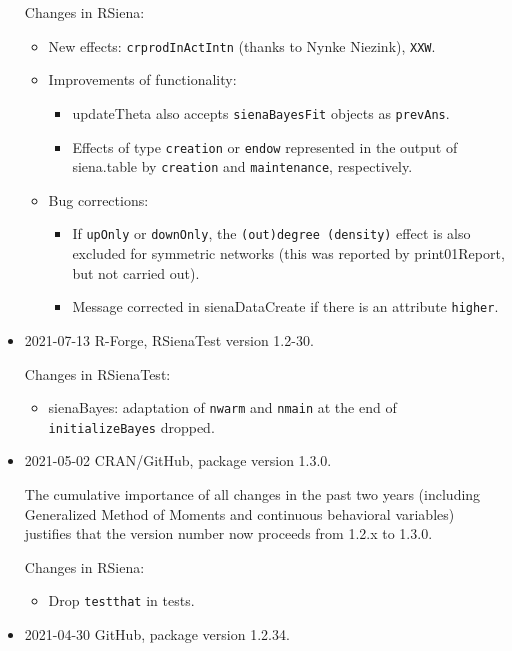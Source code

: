 \documentclass[a4paper,fleqn,11pt]{article}
\newcommand{\+}{\, + \,}
\newcommand{\sfn}[1]{\textsf{#1}}
\begin{document}
\begin{small}
\begin{itemize}
Changes in RSiena:
\begin{itemize}
\item New effects: \texttt{crprodInActIntn} (thanks to Nynke Niezink),
    \texttt{XXW}.
\item Improvements of functionality:
   \begin{itemize}
   \item \sfn{updateTheta} also accepts \texttt{sienaBayesFit} objects
     as \texttt{prevAns}.
   \item Effects of type \texttt{creation} or \texttt{endow} represented in the output of
   \textsf{siena.table} by \texttt{creation} and \texttt{maintenance}, respectively.
    \end{itemize}
\item Bug corrections:
   \begin{itemize}
   \item If \texttt{upOnly} or \texttt{downOnly},
     the \texttt{(out)degree (density)} effect is also excluded
     for symmetric networks
     (this was reported by \textsf{print01Report}, but not carried out).
   \item Message corrected in \textsf{sienaDataCreate} if there is an attribute
   \texttt{higher}.
    \end{itemize}
\end{itemize}


\item 2021-07-13  R-Forge, \sfn{RSienaTest} version 1.2-30.

Changes in \textsf{RSienaTest}:
\begin{itemize}
\item \textsf{sienaBayes}: adaptation of \texttt{nwarm} and \texttt{nmain}
     at the end of \texttt{initializeBayes} dropped.
\end{itemize}

\item 2021-05-02 CRAN/GitHub, package version 1.3.0.
\medskip

The cumulative importance of all changes in the past two years
(including Generalized Method of Moments and continuous
behavioral variables) justifies that the version number
now proceeds from 1.2.x to 1.3.0.

Changes in RSiena:
\begin{itemize}
\item Drop \texttt{testthat} in \sfn{tests}.
\end{itemize}


\item 2021-04-30 GitHub, package version 1.2.34.


\end{itemize}
\end{small}
\end{document}
